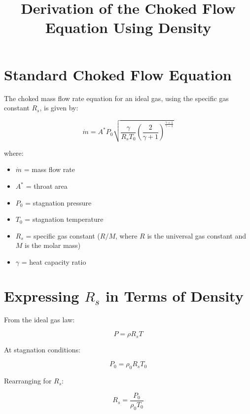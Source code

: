 \documentclass{article}
\begin{document}
\title{Derivation of the Choked Flow Equation Using Density}
\author{}
\date{}
\maketitle

\section{Standard Choked Flow Equation}

The choked mass flow rate equation for an ideal gas, using the specific gas constant \( R_s \), is given by:

\begin{equation}
\dot{m} = A^* P_0 \sqrt{\frac{\gamma}{R_s T_0} \left( \frac{2}{\gamma+1} \right)^{\frac{\gamma+1}{\gamma-1}}}
\end{equation}

where:
\begin{itemize}
    \item \( \dot{m} \) = mass flow rate
    \item \( A^* \) = throat area
    \item \( P_0 \) = stagnation pressure
    \item \( T_0 \) = stagnation temperature
    \item \( R_s \) = specific gas constant (\( R/M \), where \( R \) is the universal gas constant and \( M \) is the molar mass)
    \item \( \gamma \) = heat capacity ratio
\end{itemize}

\section{Expressing \( R_s \) in Terms of Density}

From the ideal gas law:

\begin{equation}
P = \rho R_s T
\end{equation}

At stagnation conditions:

\begin{equation}
P_0 = \rho_0 R_s T_0
\end{equation}

Rearranging for \( R_s \):

\begin{equation}
R_s = \frac{P_0}{\rho_0 T_0}
\end{equation}
\end{document}
